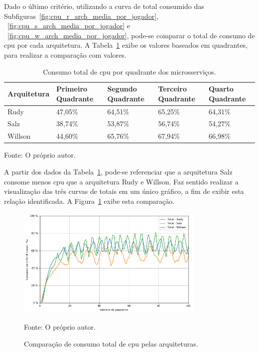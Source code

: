 Dado o último critério, utilizando a curva de total consumido das Subfiguras~\ref{fig:cpu_r_arch_media_por_jogador}, ~\ref{fig:cpu_s_arch_media_por_jogador} e ~\ref{fig:cpu_w_arch_media_por_jogador},  pode-se comparar o total de consumo de \ac{cpu} por cada arquitetura.
%
A Tabela~\ref{tab:consumo_total_cpu} exibe os valores baseados em quadrantes, para realizar a comparação com valores.


\begin{table}[htb!]
\centering
\begin{adjustbox}{max width=\textwidth}
\caption{Consumo total de \ac{cpu} por quadrante dos microsserviços.}
\label{tab:consumo_total_cpu}

\begin{tabular}{l|l|l|l|l}
\hline \hline
Arquitetura & Primeiro Quadrante & Segundo Quadrante & Terceiro Quadrante & Quarto Quadrante \\ \hline \hline
Rudy        & 47,05\%            & 64,51\%           & 65,25\%            & 64,31\%          \\ \hline
Salz        & 38,74\%            & 53,87\%           & 56,74\%            & 54,27\%          \\ \hline
Willson     & 44,60\%            & 65,76\%           & 67,94\%            & 66,98\%          \\ \hline \hline
\end{tabular}
\end{adjustbox}

Fonte: O próprio autor.
\end{table}

A partir dos dados da Tabela~\ref{tab:consumo_total_cpu}, pode-se referenciar que a arquitetura Salz consome menos \ac{cpu} que a arquitetura Rudy e Willson.
%
Faz sentido realizar a visualização das três curvas de totais em um único gráfico, a fim de exibir esta relação identificada.
%
A Figura~\ref{fig:consumo_total_cpu} exibe esta comparação.

\begin{figure}[htb!]
  \caption{Comparação de consumo total de \ac{cpu} pelas arquiteturas.}
  \label{fig:consumo_total_cpu}
  \includegraphics[width=0.8\textwidth]{figuras/analise/cpu_total_archs.png}
  \centering

  Fonte: O próprio autor.
\end{figure}


